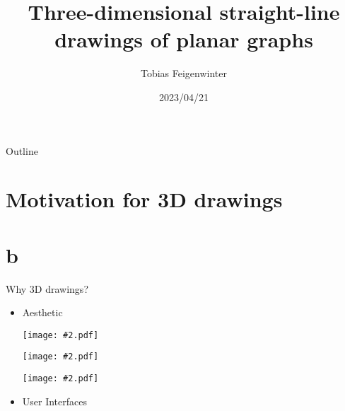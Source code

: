 \documentclass{beamer}
\title{Three-dimensional straight-line drawings of planar graphs} %
\author
{Tobias Feigenwinter}
\institute
{
ETH Zürich}
\date %
{2023/04/21}
\newcommand\still[2][1]{
    \texttt{[image: \#2.pdf]}
}
\begin{document}
\begin{frame}
  \titlepage
\end{frame}

\begin{frame}{Outline}
\tableofcontents[pausesections]
\end{frame}




\section{Motivation for 3D drawings}
\section{b}
\begin{frame}{Why 3D drawings?}{}
  \begin{itemize}
  \item<+->
    Aesthetic

    \only<+> {
	\still{static/icosahedralgraph}
    }
    \only<+> {
	\still{static/cube}
    }
    \only<+> {
	\still{anim/icosahedron}
    }
    \only<+> {
    }
  \item<+->
      User Interfaces 
  \end{itemize}
\end{frame}

\end{document}
